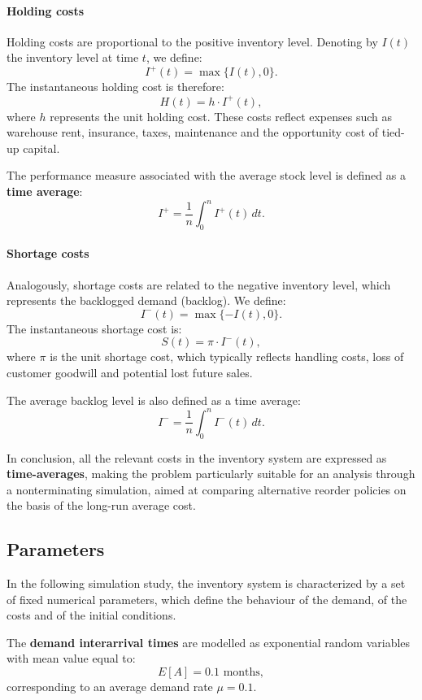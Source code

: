 \paragraph{Holding costs}
Holding costs are proportional to the positive inventory
level. Denoting by $I(t)$ the inventory level at time $t$, we define:
\[
I^{+}(t) = \max\{I(t), 0\}.
\]
The instantaneous holding cost is therefore:
\[
H(t) = h \cdot I^{+}(t),
\]
where $h$ represents the unit holding cost. These costs reflect expenses
such as warehouse rent, insurance, taxes, maintenance and the opportunity cost of
tied-up capital.

The performance measure associated with the average stock level is defined as a
\textbf{time average}:
\[
I^{+} = \frac{1}{n} \int_{0}^{n} I^{+}(t)\, dt.
\]

\paragraph{Shortage costs}
Analogously, shortage costs are related to the negative inventory level, which
represents the backlogged demand (backlog). We define:
\[
I^{-}(t) = \max\{-I(t), 0\}.
\]
The instantaneous shortage cost is:
\[
S(t) = \pi \cdot I^{-}(t),
\]
where $\pi$ is the unit shortage cost, which typically reflects handling costs,
loss of customer goodwill and potential lost future sales.

The average backlog level is also defined as a time average:
\[
I^{-} = \frac{1}{n} \int_{0}^{n} I^{-}(t)\, dt.
\]

In conclusion, all the relevant costs in the inventory system are expressed as
\textbf{time-averages}, making the problem particularly suitable for an analysis through
a nonterminating simulation, aimed at comparing alternative reorder
policies on the basis of the long-run average cost.

\subsection{Parameters}

In the following simulation study, the inventory system is characterized by a
set of fixed numerical parameters, which define the behaviour of the demand,
of the costs and of the initial conditions.

The \textbf{demand interarrival times} are modelled as exponential random variables
with mean value equal to:
\[
E[A] = 0.1 \text{ months},
\]
corresponding to an average demand rate $\mu = 0.1$.

